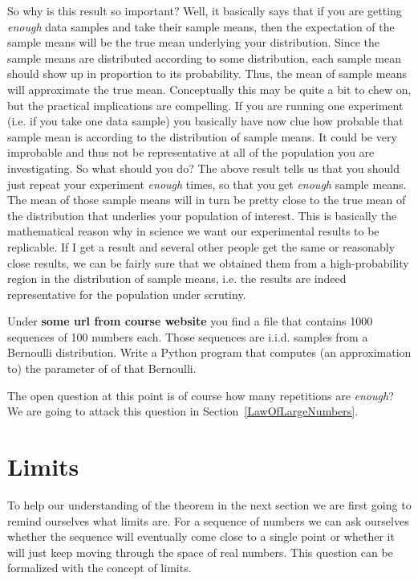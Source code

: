 So why is this result so important? Well, it basically says that if you are getting \textit{enough} data samples and take their sample means,
then the expectation of the sample means will be the true mean underlying your distribution. Since the sample means are distributed according
to some distribution, each sample mean should show up in proportion to its probability. Thus, the mean
of sample means will approximate the true mean. Conceptually this may be quite a bit to chew on, but the practical implications are compelling.
If you are running one experiment (i.e. if you take one data sample) you basically have now clue how probable that sample mean is according
to the distribution of sample means. It could be very improbable and thus not be representative at all of the population you are investigating.
So what should you do? The above result tells us that you should just repeat your experiment \textit{enough} times, so that you get
\textit{enough} sample means. The mean of those sample means will in turn be pretty close to the true mean of the distribution that underlies your population
of interest. This is basically the mathematical reason why in science we want our experimental results to be replicable. If I get a result
and several other people get the same or reasonably close results, we can be fairly sure that we obtained them from a high-probability region
in the distribution of sample means, i.e. the results are indeed representative for the population under scrutiny.

\begin{Exercise}
Under \textbf{some url from course website} you find a file that contains 1000 sequences of 100 numbers each. Those sequences are i.i.d.
samples from a Bernoulli distribution. Write a Python program that computes (an approximation to) the parameter of of that Bernoulli.
\end{Exercise}

The open question at this point is of course how many repetitions are \textit{enough}? We are going to attack this question in Section~\ref{LawOfLargeNumbers}.

\section{Limits}
To help our understanding of the theorem in the next section we are first going to remind ourselves what limits are. For a sequence of numbers
we can ask ourselves whether the sequence will eventually come close to a single point or whether it will just keep moving through the space of real numbers. This
question can be formalized with the concept of limits.

